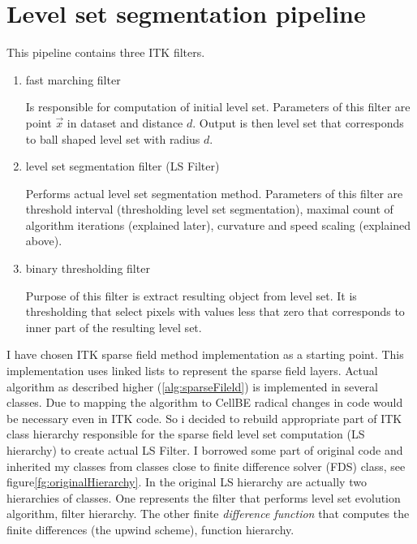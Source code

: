 \section{Level set segmentation pipeline}

This pipeline contains three ITK filters.
\begin{enumerate}
  \item{fast marching filter}
  \par
  Is responsible for computation of initial level set.
Parameters of this filter are point $\vec{x}$ in dataset and distance $d$.
Output is then level set that corresponds to ball shaped level set with radius $d$.

  \item{level set segmentation filter (LS Filter)}
  \par
  Performs actual level set segmentation method.
Parameters of this filter are threshold interval (thresholding level set segmentation),  maximal count of algorithm iterations (explained later), curvature and speed scaling (explained above).

  \item{binary thresholding filter}
  \par
  Purpose of this filter is extract resulting object from level set.
It is thresholding that select pixels with values less that zero that corresponds to inner part of the resulting level set.
\end{enumerate}

I have chosen ITK sparse field method implementation as a starting point.
This implementation uses linked lists to represent the sparse field layers.
Actual algorithm as described higher (\ref{alg:sparseFileld}) is implemented in several classes.
Due to mapping the algorithm to CellBE radical changes in code would be necessary even in ITK code.
So i decided to rebuild appropriate part of ITK class hierarchy responsible for the sparse field level set computation (LS hierarchy) to create actual LS Filter.
I borrowed some part of original code and inherited my classes from classes close to finite difference solver (FDS) class, see figure\ref{fg:originalHierarchy}.
In the original LS hierarchy are actually two hierarchies of classes.
One represents the filter that performs level set evolution algorithm, filter hierarchy.
The other finite \emph{difference function} that computes the finite differences (the upwind scheme), function hierarchy.
 
